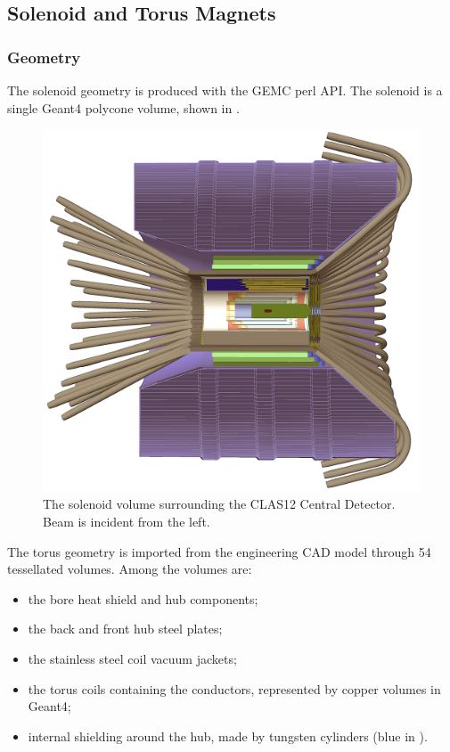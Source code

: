 \subsection{Solenoid and Torus Magnets}


\subsubsection{Geometry}
The solenoid geometry is produced with the GEMC perl API. The solenoid is a single Geant4 polycone volume, shown in .
\begin{figure}[h]
	\centering
	\includegraphics[width=0.99\columnwidth,keepaspectratio]{img/solenoid.png}
    \caption{The solenoid volume surrounding the CLAS12 Central Detector. Beam is incident from the left.}
	\label{fig:solenoid}
\end{figure}

The torus geometry is imported from the engineering CAD model through 54 tessellated volumes. Among the volumes are:

\begin{itemize}
	\item the bore heat shield and hub components;
	\item the back and front hub steel plates;
	\item the stainless steel coil vacuum jackets;
	\item the torus coils containing the conductors, represented by copper volumes in Geant4;
	\item internal shielding around the hub, made by tungsten cylinders (blue in ).
\end{itemize}

